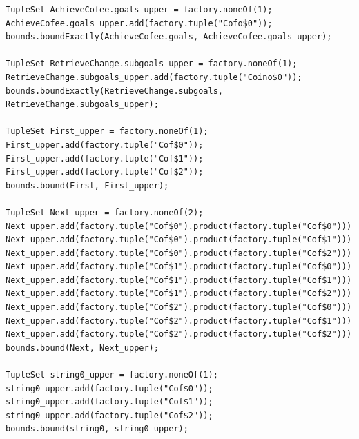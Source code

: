 \documentclass[a4paper,12pt]{report}
\begin{document}
\begin{onehalfspacing}
\begin{verbatim}
TupleSet AchieveCofee.goals_upper = factory.noneOf(1);
AchieveCofee.goals_upper.add(factory.tuple("Cofo$0"));
bounds.boundExactly(AchieveCofee.goals, AchieveCofee.goals_upper);

TupleSet RetrieveChange.subgoals_upper = factory.noneOf(1);
RetrieveChange.subgoals_upper.add(factory.tuple("Coino$0"));
bounds.boundExactly(RetrieveChange.subgoals, RetrieveChange.subgoals_upper);

TupleSet First_upper = factory.noneOf(1);
First_upper.add(factory.tuple("Cof$0"));
First_upper.add(factory.tuple("Cof$1"));
First_upper.add(factory.tuple("Cof$2"));
bounds.bound(First, First_upper);

TupleSet Next_upper = factory.noneOf(2);
Next_upper.add(factory.tuple("Cof$0").product(factory.tuple("Cof$0")));
Next_upper.add(factory.tuple("Cof$0").product(factory.tuple("Cof$1")));
Next_upper.add(factory.tuple("Cof$0").product(factory.tuple("Cof$2")));
Next_upper.add(factory.tuple("Cof$1").product(factory.tuple("Cof$0")));
Next_upper.add(factory.tuple("Cof$1").product(factory.tuple("Cof$1")));
Next_upper.add(factory.tuple("Cof$1").product(factory.tuple("Cof$2")));
Next_upper.add(factory.tuple("Cof$2").product(factory.tuple("Cof$0")));
Next_upper.add(factory.tuple("Cof$2").product(factory.tuple("Cof$1")));
Next_upper.add(factory.tuple("Cof$2").product(factory.tuple("Cof$2")));
bounds.bound(Next, Next_upper);

TupleSet string0_upper = factory.noneOf(1);
string0_upper.add(factory.tuple("Cof$0"));
string0_upper.add(factory.tuple("Cof$1"));
string0_upper.add(factory.tuple("Cof$2"));
bounds.bound(string0, string0_upper);



\end{verbatim}
\end{onehalfspacing}
\end{document}
